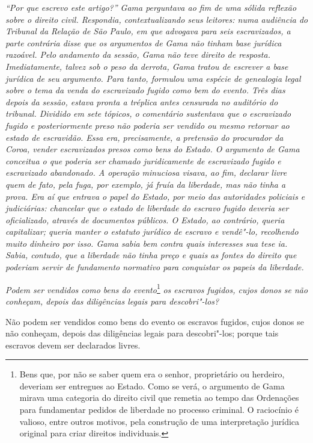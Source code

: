 \begin{flushleft}
{\footnotesize\itshape
``Por que escrevo este artigo?''
Gama perguntava ao fim de uma sólida reflexão sobre o direito civil.
Respondia, contextualizando seus leitores: numa audiência do
Tribunal da Relação de São Paulo, em que advogava para seis
escravizados, a parte contrária disse que os argumentos de Gama não tinham base
jurídica razoável. Pelo andamento da sessão, Gama não teve direito de
resposta. Imediatamente, talvez sob o peso da derrota, Gama tratou de
escrever a base jurídica de seu argumento. Para tanto, formulou uma
espécie de genealogia legal sobre o tema da venda do escravizado fugido
como bem do evento. Três dias depois da sessão, estava pronta a tréplica
antes censurada no auditório do tribunal. Dividido em sete tópicos,
o comentário sustentava
que o escravizado fugido e posteriormente preso não poderia ser vendido
ou mesmo retornar ao estado de escravidão. Essa era,
precisamente, a pretensão do procurador da Coroa, vender escravizados
presos como bens do Estado. O argumento de Gama conceitua o que poderia
ser chamado juridicamente de escravizado fugido e escravizado
abandonado. A operação minuciosa visava, ao fim, declarar livre quem de
fato, pela fuga, por exemplo, já fruía da liberdade,
mas não tinha a prova. Era aí que
entrava o papel do Estado, por meio das autoridades policiais e
judiciárias: chancelar que o
estado de liberdade do escravo fugido deveria ser oficializado, através de documentos
públicos. O Estado, ao contrário, queria capitalizar; queria manter o
estatuto jurídico de escravo e vendê"-lo,
recolhendo muito dinheiro por isso. Gama sabia bem contra quais
interesses sua tese ia. Sabia, contudo, que a liberdade não tinha preço
e quais as fontes do direito que poderiam servir de fundamento normativo
para conquistar os papeis da liberdade.}
\end{flushleft}


\emph{Podem ser vendidos como bens do evento}\footnote{Bens que, por
  não se saber quem era o senhor, proprietário ou herdeiro, deveriam ser
  entregues ao Estado. Como se verá, o argumento de Gama mirava uma
  categoria do direito civil que remetia ao tempo das Ordenações para
  fundamentar pedidos de liberdade no processo criminal. O raciocínio é
  valioso, entre outros motivos, pela construção de uma interpretação
  jurídica original para criar direitos individuais.} \emph{os escravos
fugidos, cujos donos se não conheçam, depois das diligências legais para
descobri"-los?}

Não podem ser vendidos como bens do evento os escravos fugidos, cujos
donos se não conheçam, depois das diligências legais para descobri"-los;
porque tais escravos devem ser declarados livres.

